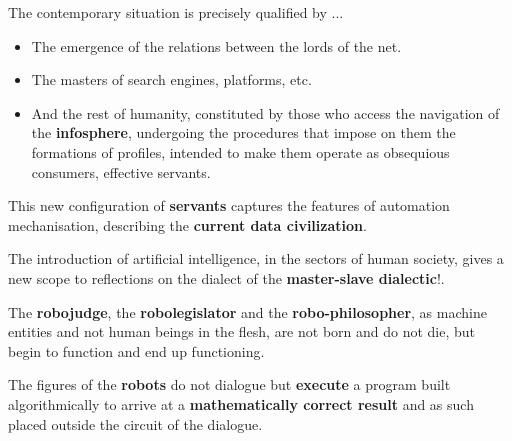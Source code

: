 The contemporary situation is precisely qualified by ... 
\begin{itemize}
    \item The emergence of the relations between the lords of the net.
    \item The masters of search engines, platforms, etc.
    \item And the rest of humanity, constituted by those who access the navigation of the \textbf{infosphere}, undergoing the procedures that impose on them the formations of profiles, intended to make them operate as obsequious consumers, effective servants.
\end{itemize}

This new configuration of \textbf{servants} captures the features of automation mechanisation, describing the \textbf{current data civilization}.

The introduction of artificial intelligence, in the sectors of human society, gives a new scope to reflections on the dialect of the 
\textbf{master-slave dialectic}!.

\begin{claim}
    The \textbf{robojudge}, the \textbf{robolegislator} and the \textbf{robo-philosopher}, as machine
    entities and not human beings in the flesh, are not born and do not die, but begin to function and 
    end up functioning.
\end{claim}

\begin{claim}
    The figures of the \textbf{robots} do not dialogue but \textbf{execute} a program built algorithmically 
    to arrive at a \textbf{mathematically correct result} and as such placed outside the circuit of the dialogue.
\end{claim}